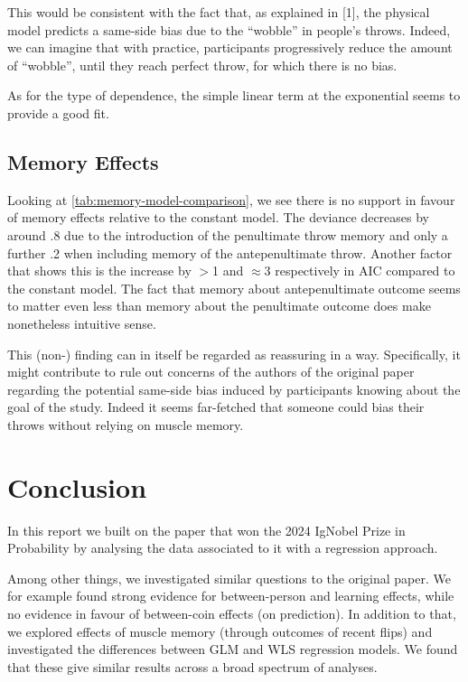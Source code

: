 \documentclass[a4paper, 12pt,oneside]{article}
\begin{document}
			This would be consistent with the fact that, as explained in [1], the physical model predicts a same-side bias due to the ``wobble'' in people's throws. Indeed, we can imagine that with practice, participants progressively reduce the amount of ``wobble'', until they reach perfect throw, for which there is no bias. 

			As for the type of dependence, the simple linear term at the exponential seems to provide a good fit.  
		\subsection{Memory Effects}
		Looking at \ref{tab:memory-model-comparison}, we see there is no support in favour of memory effects relative to the constant model. The deviance decreases by around .8 due to the introduction of the penultimate throw memory and only a further .2 when including memory of the antepenultimate throw. Another factor that shows this is the increase by $>$1 and $\approx 3$ respectively in AIC compared to the constant model.
		The fact that memory about antepenultimate outcome seems to matter even less than memory about the penultimate outcome does make nonetheless intuitive sense. 

		This (non-) finding can in itself be regarded as reassuring in a way. Specifically, it might contribute to rule out concerns of the authors of the original paper regarding the potential same-side bias induced by participants knowing about the goal of the study. Indeed it seems far-fetched that someone could bias their throws without relying on muscle memory. 
	\section{Conclusion}
		In this report we built on the paper that won the 2024 IgNobel Prize in Probability by analysing the data associated to it with a regression approach. 
		
		Among other things, we investigated similar questions to the original paper. We for example found strong evidence for between-person and learning effects, while no evidence in favour of between-coin effects (on prediction). In addition to that, we explored effects of muscle memory (through outcomes of recent flips) and investigated the differences between GLM and WLS regression models. We found that these give similar results across a broad spectrum of analyses.
\end{document}

